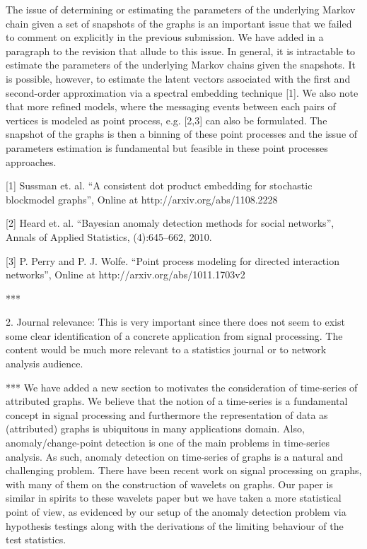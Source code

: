     The issue of determining or estimating the parameters of the
    underlying Markov chain given a set of snapshots of the graphs is
    an important issue that we failed to comment on explicitly in the
    previous submission. We have added in a paragraph to the revision
    that allude to this issue. In general, it is intractable to
    estimate the parameters of the underlying Markov chains given the
    snapshots. It is possible, however, to estimate the latent vectors
    associated with the first and second-order approximation via
    a spectral embedding technique [1]. We also
    note that more refined models, where the messaging events between each pairs of
    vertices is modeled as point process,
    e.g. [2,3] can also be formulated. The
    snapshot of the graphs is then a binning of these point processes and
    the issue of parameters estimation is fundamental but feasible in 
    these point processes approaches.

[1] Sussman et. al. ``A consistent dot product embedding for
stochastic blockmodel graphs'', Online at http://arxiv.org/abs/1108.2228

[2] Heard et. al. ``Bayesian anomaly detection methods for social
networks'', Annals of Applied Statistics, (4):645--662, 2010.

[3] P. Perry and P. J. Wolfe. ``Point process modeling for directed
interaction networks'', Online at http://arxiv.org/abs/1011.1703v2

***

2. Journal relevance: This is very important since there does not seem
to exist some clear identification of a concrete application from
signal processing. The content would be much more relevant to a
statistics journal or to network analysis audience.

*** 
We have added a new section to motivates the consideration of
time-series of attributed graphs. We believe that the notion of a
time-series is a fundamental concept in signal processing and
furthermore the representation of data as (attributed) graphs is
ubiquitous in many applications domain. Also, anomaly/change-point
detection is one of the main problems in time-series analysis.  As
such, anomaly detection on time-series of graphs is a natural and
challenging problem. There have been recent work on signal processing
on graphs, with many of them on the construction of wavelets on
graphs. Our paper is similar in spirits to these wavelets paper but we
have taken a more statistical point of view, as evidenced by our 
setup of the anomaly detection problem via hypothesis testings along
with the derivations of the limiting behaviour of the test statistics.

